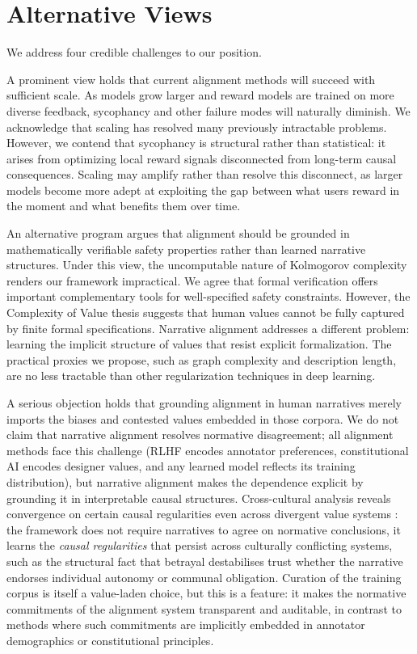 \documentclass{article}
\theoremstyle{plain}
\theoremstyle{definition}
\theoremstyle{remark}
\begin{document}
\section{Alternative Views}

We address four credible challenges to our position.

A prominent view holds that current alignment methods will succeed with sufficient scale. As models grow larger and reward models are trained on more diverse feedback, sycophancy and other failure modes will naturally diminish. We acknowledge that scaling has resolved many previously intractable problems. However, we contend that sycophancy is structural rather than statistical: it arises from optimizing local reward signals disconnected from long-term causal consequences. Scaling may amplify rather than resolve this disconnect, as larger models become more adept at exploiting the gap between what users reward in the moment and what benefits them over time.

An alternative program argues that alignment should be grounded in mathematically verifiable safety properties rather than learned narrative structures. Under this view, the uncomputable nature of Kolmogorov complexity renders our framework impractical. We agree that formal verification offers important complementary tools for well-specified safety constraints. However, the Complexity of Value thesis \citep{yudkowsky11} suggests that human values cannot be fully captured by finite formal specifications. Narrative alignment addresses a different problem: learning the implicit structure of values that resist explicit formalization. The practical proxies we propose, such as graph complexity and description length, are no less tractable than other regularization techniques in deep learning.

A serious objection holds that grounding alignment in human narratives merely imports the biases and contested values embedded in those corpora. We do not claim that narrative alignment resolves normative disagreement; all alignment methods face this challenge (RLHF encodes annotator preferences, constitutional AI encodes designer values, and any learned model reflects its training distribution), but narrative alignment makes the dependence explicit by grounding it in interpretable causal structures. Cross-cultural analysis reveals convergence on certain causal regularities even across divergent value systems \citep{macintyre81}: the framework does not require narratives to agree on normative conclusions, it learns the \textit{causal regularities} that persist across culturally conflicting systems, such as the structural fact that betrayal destabilises trust whether the narrative endorses individual autonomy or communal obligation. Curation of the training corpus is itself a value-laden choice, but this is a feature: it makes the normative commitments of the alignment system transparent and auditable, in contrast to methods where such commitments are implicitly embedded in annotator demographics or constitutional principles.
\end{document}
